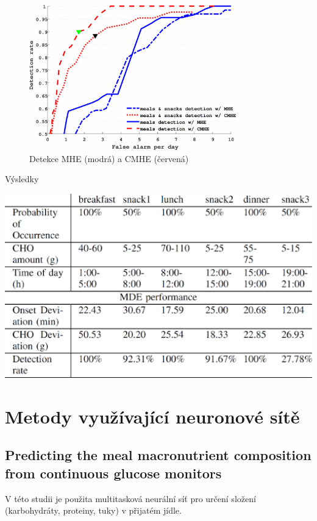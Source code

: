 \begin{figure}[H]
\caption{Detekce MHE (modrá) a CMHE (červená)}
\label{fig:horizon4}
\centering
\includegraphics[width=0.8\textwidth]{img/analyza/horizon4.png}
\end{figure}

\begin{table}[H]
\caption{Výsledky}
\label{tab:horizon5}
\centering
\includegraphics[width=1\textwidth]{img/analyza/horizon5.png}
\end{table}


\section{Metody využívající neuronové sítě}
\subsection{Predicting the meal macronutrient composition from continuous glucose monitors \citep{Analyza.Neuronka}}
\label{ch:neuronka}

V této studii je použita multitasková neurální síť pro určení složení (karbohydráty, proteiny, tuky) v přijatém jídle.

